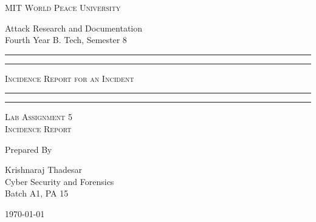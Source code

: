 \documentclass[11pt]{book}
\begin{document}
\begin{titlepage}
	\centering


	\huge\textsc{
		MIT World Peace University
	}\\

	\vspace{0.75\baselineskip} %

	\LARGE{
		Attack Research and Documentation\\
		Fourth Year B. Tech, Semester 8
	}

	\vfill %


	\rule{\textwidth}{1.6pt}\vspace*{-\baselineskip}\vspace*{2pt}
	\rule{\textwidth}{0.6pt}
	\vspace{0.75\baselineskip} %

	\huge{\textsc{
        Incidence Report for an Incident
        }} \\

	\vspace{0.5\baselineskip} %
	\rule{\textwidth}{0.6pt}\vspace*{-\baselineskip}\vspace*{2.8pt}
	\rule{\textwidth}{1.6pt}

	\vspace{1\baselineskip} %


	\LARGE\textsc{
		Lab Assignment 5 \\
        Incidence Report
	} %
	\vfill


	Prepared By \vspace{0.5\baselineskip} %

	\Large{
		Krishnaraj Thadesar \\
		Cyber Security and Forensics\\
        Batch A1, PA 15
	}

	\vspace{0.5\baselineskip} %
	\today

\end{titlepage}
\end{document}

